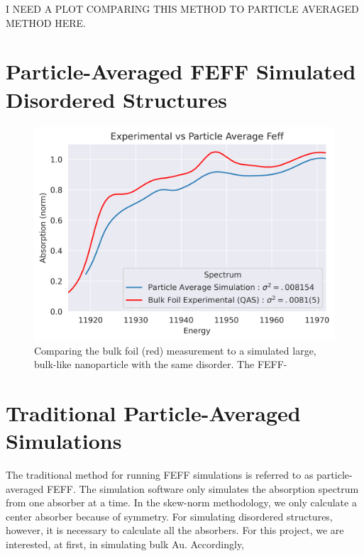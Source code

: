 I NEED A PLOT COMPARING THIS METHOD TO PARTICLE AVERAGED METHOD HERE.

\section{Particle-Averaged FEFF Simulated Disordered Structures} \label{sec:pa-feff-vs-gaussian-feff}

\begin{figure}[h]
	\centering
	\includegraphics[width=.7\linewidth]{Chapters/Figures/Bulk_experimental_vs_pa_comparison.png}
	\caption[Simulation vs. Experimental 3]{Comparing the bulk foil (red) measurement to a simulated large, bulk-like nanoparticle with the same disorder. The FEFF-}
	\label{fig:avg-experimental-vs-simulation2}
\end{figure}

\section{Traditional Particle-Averaged Simulations} 
\label{sec:traditional-disorder}
The traditional method for running FEFF simulations is referred to as particle-averaged FEFF. The simulation software only simulates the absorption spectrum from one absorber at a time. In the skew-norm methodology, we only calculate a center absorber because of symmetry. For simulating disordered structures, however, it is necessary to calculate all the absorbers. For this project, we are interested, at first, in simulating bulk Au. Accordingly, 
